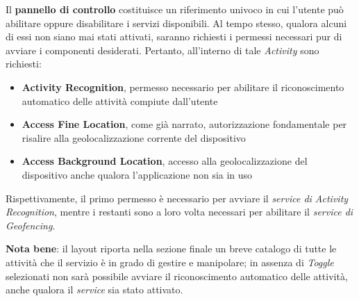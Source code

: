 \documentclass{article}
\begin{document}
    Il \textbf{pannello di controllo} costituisce un riferimento univoco in cui l'utente può abilitare oppure disabilitare i servizi disponibili. Al tempo stesso, qualora alcuni di essi non siano mai stati attivati, saranno richiesti i permessi necessari pur di avviare i componenti desiderati. Pertanto, all'interno di tale \textit{Activity} sono richiesti:
    \begin{itemize}
        \renewcommand{\labelitemi}{-}
        \item \textbf{Activity Recognition}, permesso necessario per abilitare il riconoscimento automatico delle attività compiute dall'utente
        \item \textbf{Access Fine Location}, come già narrato, autorizzazione fondamentale per risalire alla geolocalizzazione corrente del dispositivo
        \item \textbf{Access Background Location}, accesso alla geolocalizzazione del dispositivo anche qualora l'applicazione non sia in uso
    \end{itemize}
    Rispettivamente, il primo permesso è necessario per avviare il \textit{service di Activity Recognition}, mentre i restanti sono a loro volta necessari per abilitare
    il \textit{service di Geofencing}.
    \begin{center}
        \begin{figure}[H]
            \centering
        \end{figure}
    \end{center}
    \textbf{Nota bene}: il layout riporta nella sezione finale un breve catalogo di tutte le attività che il servizio è in grado di gestire e manipolare; in assenza di \textit{Toggle} selezionati non sarà possibile avviare il riconoscimento automatico delle attività, anche qualora il \textit{service} sia stato attivato.

    \newpage
\end{document}

